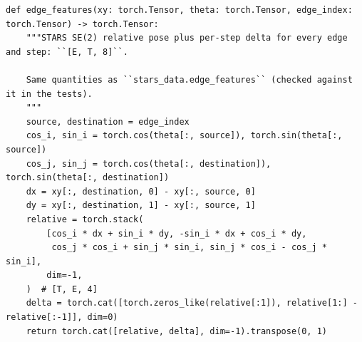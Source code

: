 \documentclass[10pt]{article}
\begin{document}
\par\smallskip{}\par\nopagebreak
\begin{lstlisting}[aboveskip=2pt]
def edge_features(xy: torch.Tensor, theta: torch.Tensor, edge_index: torch.Tensor) -> torch.Tensor:
    """STARS SE(2) relative pose plus per-step delta for every edge and step: ``[E, T, 8]``.

    Same quantities as ``stars_data.edge_features`` (checked against it in the tests).
    """
    source, destination = edge_index
    cos_i, sin_i = torch.cos(theta[:, source]), torch.sin(theta[:, source])
    cos_j, sin_j = torch.cos(theta[:, destination]), torch.sin(theta[:, destination])
    dx = xy[:, destination, 0] - xy[:, source, 0]
    dy = xy[:, destination, 1] - xy[:, source, 1]
    relative = torch.stack(
        [cos_i * dx + sin_i * dy, -sin_i * dx + cos_i * dy,
         cos_j * cos_i + sin_j * sin_i, sin_j * cos_i - cos_j * sin_i],
        dim=-1,
    )  # [T, E, 4]
    delta = torch.cat([torch.zeros_like(relative[:1]), relative[1:] - relative[:-1]], dim=0)
    return torch.cat([relative, delta], dim=-1).transpose(0, 1)

\end{lstlisting}
\end{document}
